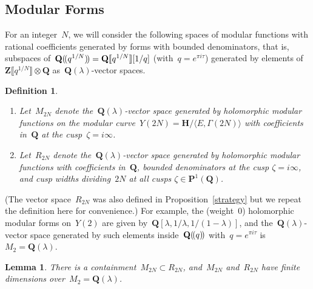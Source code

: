 \documentclass[10pt]{amsart}
\def\llp{(\kern-0.15em{(}}
\def\rrp{)\kern-0.15em{)}}
\def\Z{\mathbf{Z}}
\def\Q{\mathbf{Q}}
\newtheorem{lemma}[subsubsection]{Lemma}
\newtheorem{df}[subsubsection]{Definition}
\theoremstyle{remark}
\numberwithin{equation}{subsection}
\def\H{\mathbf{H}}
\begin{document}
\subsection{Modular Forms}



For an  integer~$N$, we will consider the following spaces of modular functions
with rational coefficients generated by forms with bounded denominators,
 that is, subspaces of~$\Q \llp q^{1/N} \rrp = \Q \llbracket q^{1/N} \rrbracket [1/q]$ 
 (with~$q = e^{\pi i \tau}$) generated by elements
of~$\Z \llbracket q^{1/N} \rrbracket \otimes \Q$ as~$\Q(\lambda)$-vector spaces.
\begin{df} \label{rings}  \leavevmode
\begin{enumerate}
\item Let~$M_{2N}$ denote the~$\Q(\lambda)$-vector space generated by holomorphic modular functions on the modular curve~$Y(2N) = \H/\langle E,\Gamma(2N)\rangle$
with coefficients in~$\Q$ at the cusp~$\zeta = i \infty$.
\item Let~$R_{2N}$ denote the~$\Q(\lambda)$-vector space  generated by holomorphic modular functions
with coefficients in~$\Q$,  bounded denominators at the cusp $\zeta = i \infty$, and cusp widths dividing~$2N$ at all cusps $\zeta \in \mathbf{P}^1(\Q)$.
\end{enumerate}
\end{df}

(The vector space~$R_{2N}$ was also defined in Proposition~\ref{strategy} but we repeat the definition here for convenience.)
For example, the (weight~$0$) holomorphic modular forms on~$Y(2)$ are given by~$\Q[\lambda, 1/\lambda, 1/(1-\lambda)]$, and the~$\Q(\lambda)$-vector
space generated by such elements inside~$\Q \llp q \rrp $ with~$q = e^{\pi i \tau}$ is~$M_2 = \Q(\lambda)$.

\begin{lemma}  \label{unrefined} There is a containment~$M_{2N} \subset R_{2N}$, and~$M_{2N}$ and~$R_{2N}$ have finite dimensions over~$M_2 = \Q(\lambda)$.
\end{lemma}
\end{document}
